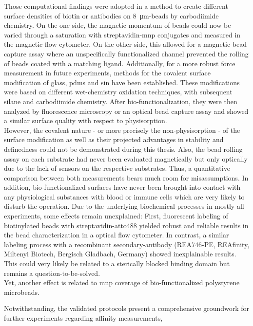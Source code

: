 Those computational findings were adopted in a method to create different surface densities of biotin or antibodies on \SI{8}{\micro\meter}-beads by carbodiimide chemistry. On the one side, the magnetic momentum of beads could now be varied through a saturation with streptavidin-\gls{mnp} conjugates and measured in the magnetic flow cytometer. On the other side, this allowed for a magnetic bead capture assay where an unspecifically functionalized channel prevented the rolling of beads coated with a matching ligand. Additionally, for a more robust force measurement in future experiments, methods for the covalent surface modification of glass, \gls{pdms} and \gls{sin} have been established. These modifications were based on different wet-chemistry oxidation techniques, with subsequent silane and carbodiimide chemistry. After bio-functionalization, they were then analyzed by fluorescence microscopy or an optical bead capture assay and showed a similar surface quality with respect to physisorption.\\
However, the covalent nature - or more precisely the non-physisorption -  of the surface modification as well as their projected advantages in stability and definedness could not be demonstrated during this thesis. Also, the bead rolling assay on each substrate had never been evaluated magnetically but only optically due to the lack of sensors on the respective substrates. Thus, a quantitative comparison between both measurements bears much room for misassumptions. In addition, bio-functionalized surfaces have never been brought into contact with any physiological substances with blood or immune cells which are very likely to disturb the operation.
Due to the underlying biochemical processes in mostly all experiments, some effects remain unexplained: First, fluorescent labeling of biotinylated beads with streptavidin-atto488 yielded robust and reliable results in the bead characterization in a optical flow cytometer. In contrast, a similar labeling process with a recombinant secondary-antibody (REA746-PE, REAfinity, Miltenyi Biotech, Bergisch Gladbach, Germany) showed inexplainable results. This could very likely be related to a sterically blocked binding domain but remains a question-to-be-solved.\\
Yet, another effect is related to \gls{mnp} coverage of bio-functionalized polystyrene microbeads.

 Notwithstanding, the validated protocols present a comprehensive groundwork for further experiments regarding affinity measurements, 
 

